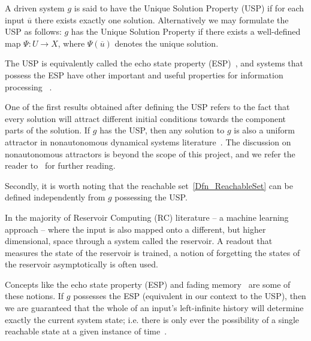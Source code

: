 \begin{Definition}
  \label{Dfn_usp}\rm
  A driven system $g$ is said to have the Unique Solution Property (USP) if for each input $\overline{u}$ there exists exactly one solution. 
  Alternatively we may formulate the USP as follows: $g$ has the Unique Solution Property if there exists a well-defined map $\Psi:{U}\to{X}$, where $\Psi({\overline{u}})$ denotes the unique solution.
\end{Definition}

The USP is equivalently called  the echo state property (ESP)~\cite{Manju_ESP}, and systems that possess the ESP have other important and useful properties for information processing~\cite{grigoryeva2018echo, grigoryeva2019differentiable, manjunath2020stability} .  

One of the first results obtained after defining the USP refers to the fact that every solution will attract different initial conditions towards the component parts of the solution.
If $g$ has the USP, then any solution to $g$ is also a uniform attractor in nonautonomous dynamical systems literature~\cite{Manju_Nonlinearity}. The discussion on nonautonomous attractors is beyond the scope of this project, and we refer the reader to~\cite{Manju_ESP, esann2012ids} for further reading. 

Secondly, it is worth noting that the reachable set~\ref{Dfn_ReachableSet} can be defined independently from $g$ possessing the USP. 

In the majority of Reservoir Computing (RC) literature -- a machine learning approach -- where the input is also mapped onto a different, but higher dimensional, space through a system called the reservoir. A readout that measures the state of the reservoir is trained, a notion of forgetting the states of the reservoir asymptotically is often used.   

Concepts like the echo state property (ESP) and fading memory~\cite{boyd1985fading} are some of these notions.  
If $g$ possesses the ESP (equivalent in our context to the USP), then we are guaranteed that the whole of an input's left-infinite history will determine exactly the current system state; i.e. there is only ever the possibility of a single reachable state at a given instance of time~\cite{jaeger2001echo,Manju_2020}.

